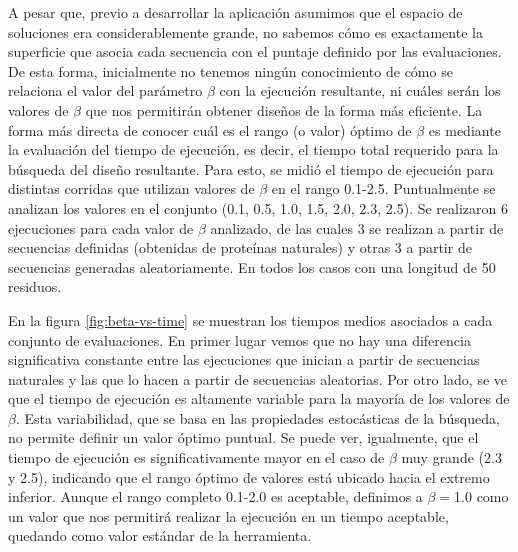 A pesar que, previo a desarrollar la aplicación asumimos que el espacio de soluciones era considerablemente grande, no sabemos cómo es exactamente 
la superficie que asocia cada secuencia con el puntaje definido por las evaluaciones. 
De esta forma, inicialmente no tenemos ningún conocimiento de cómo se relaciona el valor del parámetro $\beta$ con la ejecución
resultante, ni cuáles serán los valores de $\beta$ que nos permitirán obtener diseños de la forma más eficiente.
La forma más directa de conocer cuál es el rango (o valor) óptimo de $\beta$ es mediante la evaluación del tiempo de ejecución, es decir, el tiempo total requerido para la búsqueda del diseño resultante. 
Para esto, se midió el tiempo de ejecución para distintas corridas que utilizan valores de $\beta$ en el rango 0.1-2.5.
Puntualmente se analizan los valores en el conjunto (0.1, 0.5, 1.0, 1.5, 2.0, 2.3, 2.5). 
Se realizaron 6 ejecuciones para cada valor de $\beta$ analizado, de las cuales 3 se realizan a partir de secuencias definidas (obtenidas de proteínas naturales) y otras 3 a partir de secuencias generadas aleatoriamente.
En todos los casos con una longitud de 50 residuos.

En la figura \ref{fig:beta-vs-time} se muestran los tiempos medios asociados a cada conjunto de evaluaciones.
En primer lugar vemos que no hay una diferencia significativa constante entre las ejecuciones que inician a partir de secuencias naturales y las que lo hacen a partir de secuencias aleatorias.
Por otro lado, se ve que el tiempo de ejecución es altamente variable para la mayoría de los valores de $\beta$.
Esta variabilidad, que se basa en las propiedades estocásticas de la búsqueda, no permite definir un valor óptimo puntual. Se puede ver, igualmente, que el tiempo de ejecución es significativamente mayor en el caso de $\beta$ muy grande (2.3 y 2.5), 
indicando que el rango óptimo de valores está ubicado hacia el extremo inferior.
Aunque el rango completo 0.1-2.0 es aceptable, definimos a $\beta=$1.0 como un valor que nos permitirá realizar la ejecución en un tiempo aceptable, quedando como valor estándar de la herramienta.



